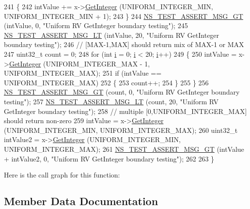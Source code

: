 \begin{DoxyCode}
241     \{
242       intValue += x->\hyperlink{classns3_1_1RandomVariableStream_a66cd94e6305ce7f000f1a9ff0fcb9aef}{GetInteger} (UNIFORM\_INTEGER\_MIN, UNIFORM\_INTEGER\_MIN + 1);
243     \}
244   \hyperlink{group__testing_ga868cfb773df312b867a506bdd2e3cbef}{NS\_TEST\_ASSERT\_MSG\_GT} (intValue, 0, \textcolor{stringliteral}{"Uniform RV GetInteger boundary testing"});
245   \hyperlink{group__testing_ga1d96848b91407c9a0b36583e8b0ad7ae}{NS\_TEST\_ASSERT\_MSG\_LT} (intValue, 20, \textcolor{stringliteral}{"Uniform RV GetInteger boundary testing"});
246   \textcolor{comment}{// [MAX-1,MAX] should return mix of MAX-1 or MAX}
247   uint32\_t count = 0;
248   \textcolor{keywordflow}{for} (\textcolor{keywordtype}{int} \hyperlink{bernuolliDistribution_8m_a6f6ccfcf58b31cb6412107d9d5281426}{i} = 0; \hyperlink{bernuolliDistribution_8m_a6f6ccfcf58b31cb6412107d9d5281426}{i} < 20; \hyperlink{bernuolliDistribution_8m_a6f6ccfcf58b31cb6412107d9d5281426}{i}++)
249     \{
250       intValue = x->\hyperlink{classns3_1_1RandomVariableStream_a66cd94e6305ce7f000f1a9ff0fcb9aef}{GetInteger} (UNIFORM\_INTEGER\_MAX - 1, UNIFORM\_INTEGER\_MAX);
251       \textcolor{keywordflow}{if} (intValue == UNIFORM\_INTEGER\_MAX)
252         \{
253           count++;
254         \}
255     \}
256   \hyperlink{group__testing_ga868cfb773df312b867a506bdd2e3cbef}{NS\_TEST\_ASSERT\_MSG\_GT} (count, 0, \textcolor{stringliteral}{"Uniform RV GetInteger boundary testing"});
257   \hyperlink{group__testing_ga1d96848b91407c9a0b36583e8b0ad7ae}{NS\_TEST\_ASSERT\_MSG\_LT} (count, 20, \textcolor{stringliteral}{"Uniform RV GetInteger boundary testing"});
258   \textcolor{comment}{// multiple [0,UNIFORM\_INTEGER\_MAX] should return non-zero}
259   intValue = x->\hyperlink{classns3_1_1RandomVariableStream_a66cd94e6305ce7f000f1a9ff0fcb9aef}{GetInteger} (UNIFORM\_INTEGER\_MIN, UNIFORM\_INTEGER\_MAX);
260   uint32\_t intValue2 = x->\hyperlink{classns3_1_1RandomVariableStream_a66cd94e6305ce7f000f1a9ff0fcb9aef}{GetInteger} (UNIFORM\_INTEGER\_MIN, UNIFORM\_INTEGER\_MAX);
261   \hyperlink{group__testing_ga868cfb773df312b867a506bdd2e3cbef}{NS\_TEST\_ASSERT\_MSG\_GT} (intValue + intValue2, 0, \textcolor{stringliteral}{"Uniform RV GetInteger boundary
       testing"});
262 
263 \}
\end{DoxyCode}


Here is the call graph for this function\+:




\subsection{Member Data Documentation}
